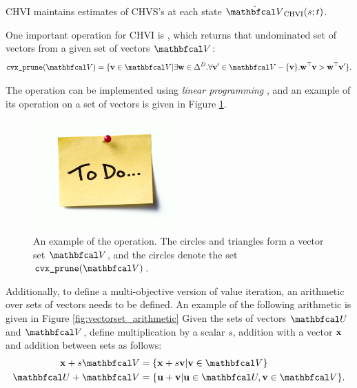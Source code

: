         CHVI maintains estimates of CHVS's at each state $\Vchvi(s;t)$.

        One important operation for CHVI is \cprune, which returns that undominated set of vectors from a given set of vectors $\bfcl{V}$:
        \begin{align}
            \cprune(\bfcl{V}) = \{\bff{v}\in\bfcl{V} | \exists \bff{w}\in\Delta^D. \forall \bff{v}'\in\bfcl{V}-\{\bff{v}\}. \bff{w}^\top \bff{v} > \bff{w}^\top \bff{v}' \}.
        \end{align}

        The \cprune\ewe operation can be implemented using \textit{linear programming} , and an example of its operation on a set of vectors is given in Figure \ref{fig:convex_prune}.

        \begin{figure}
            \centering\includegraphics[width=0.5\textwidth]{figures/todo.jpg} 
            \caption[An example of the \cprune\ewe operation.]{An example of the \cprune\ewe operation. The circles and triangles form a vector set $\bfcl{V}$, and the circles denote the set $\cprune(\bfcl{V})$.}
            \label{fig:convex_prune}
        \end{figure}

        Additionally, to define a multi-objective version of value iteration, an arithmetic over sets of vectors needs to be defined. An example of the following arithmetic is given in Figure \ref{fig:vectorset_arithmetic} Given the sets of vectors $\bfcl{U}$ and $\bfcl{V}$, define multiplication by a scalar $s$, addition with a vector $\mathbf{x}$ and addition between sets as follows:
        \begin{align}
            \bff{x} + s\bfcl{V} &= \{\bff{x} + s\bff{v} | \bff{v}\in\bfcl{V} \} \\
            \bfcl{U} + \bfcl{V} &= \{ \bff{u}+\bff{v} | \bff{u}\in\bfcl{U}, \bff{v}\in\bfcl{V} \}.
        \end{align}

